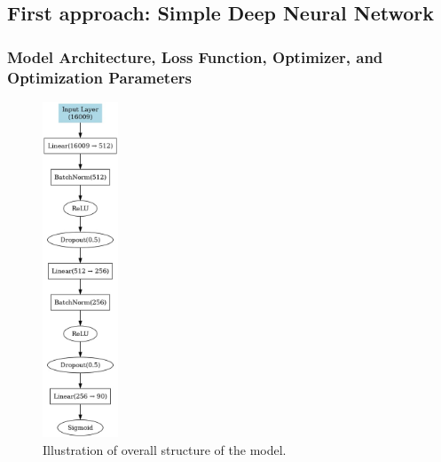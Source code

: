 \documentclass{article}
\begin{document}
\subsection{First approach: Simple Deep Neural Network}

\subsubsection{Model Architecture, Loss Function, Optimizer, and Optimization Parameters}
\begin{figure}[h!]
  \centering
  \includegraphics[width=0.2\textwidth]{DNN.png} 
  \caption{Illustration of overall structure of the model.}
  \label{fig:your-label}
\end{figure}
\end{document}

